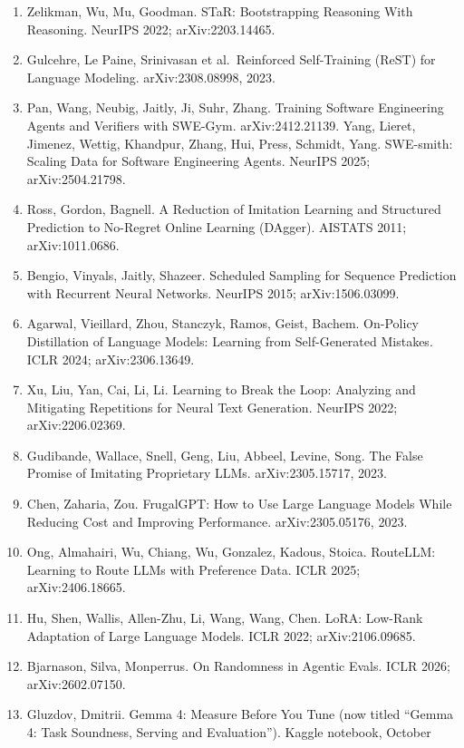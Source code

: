 \documentclass[
  11pt,
  a4paper,
]{article}
\providecommand{\tightlist}{%
  \setlength{\itemsep}{0pt}\setlength{\parskip}{0pt}}
\begin{document}
\begin{enumerate}
\def\labelenumi{\arabic{enumi}.}
\tightlist
\item
  Zelikman, Wu, Mu, Goodman. STaR: Bootstrapping Reasoning With
  Reasoning. NeurIPS 2022; arXiv:2203.14465.
\item
  Gulcehre, Le Paine, Srinivasan et al.~Reinforced Self-Training (ReST)
  for Language Modeling. arXiv:2308.08998, 2023.
\item
  Pan, Wang, Neubig, Jaitly, Ji, Suhr, Zhang. Training Software
  Engineering Agents and Verifiers with SWE-Gym. arXiv:2412.21139. Yang,
  Lieret, Jimenez, Wettig, Khandpur, Zhang, Hui, Press, Schmidt, Yang.
  SWE-smith: Scaling Data for Software Engineering Agents. NeurIPS 2025;
  arXiv:2504.21798.
\item
  Ross, Gordon, Bagnell. A Reduction of Imitation Learning and
  Structured Prediction to No-Regret Online Learning (DAgger). AISTATS
  2011; arXiv:1011.0686.
\item
  Bengio, Vinyals, Jaitly, Shazeer. Scheduled Sampling for Sequence
  Prediction with Recurrent Neural Networks. NeurIPS 2015;
  arXiv:1506.03099.
\item
  Agarwal, Vieillard, Zhou, Stanczyk, Ramos, Geist, Bachem. On-Policy
  Distillation of Language Models: Learning from Self-Generated
  Mistakes. ICLR 2024; arXiv:2306.13649.
\item
  Xu, Liu, Yan, Cai, Li, Li. Learning to Break the Loop: Analyzing and
  Mitigating Repetitions for Neural Text Generation. NeurIPS 2022;
  arXiv:2206.02369.
\item
  Gudibande, Wallace, Snell, Geng, Liu, Abbeel, Levine, Song. The False
  Promise of Imitating Proprietary LLMs. arXiv:2305.15717, 2023.
\item
  Chen, Zaharia, Zou. FrugalGPT: How to Use Large Language Models While
  Reducing Cost and Improving Performance. arXiv:2305.05176, 2023.
\item
  Ong, Almahairi, Wu, Chiang, Wu, Gonzalez, Kadous, Stoica. RouteLLM:
  Learning to Route LLMs with Preference Data. ICLR 2025;
  arXiv:2406.18665.
\item
  Hu, Shen, Wallis, Allen-Zhu, Li, Wang, Wang, Chen. LoRA: Low-Rank
  Adaptation of Large Language Models. ICLR 2022; arXiv:2106.09685.
\item
  Bjarnason, Silva, Monperrus. On Randomness in Agentic Evals. ICLR
  2026; arXiv:2602.07150.
\item
  Gluzdov, Dmitrii. Gemma 4: Measure Before You Tune (now titled ``Gemma
  4: Task Soundness, Serving and Evaluation''). Kaggle notebook, October

\end{enumerate}
\end{document}
